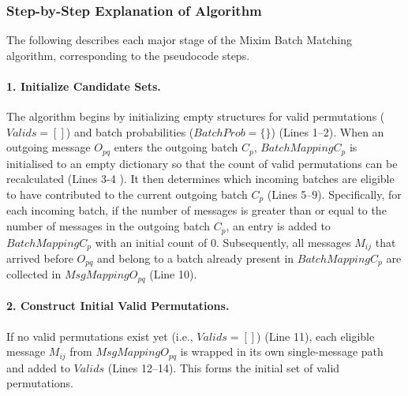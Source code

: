 \documentclass{article}
\begin{document}
\subsubsection*{Step-by-Step Explanation of Algorithm}

The following describes each major stage of the Mixim Batch Matching algorithm, corresponding to the pseudocode steps.

\paragraph{1. Initialize Candidate Sets.}
The algorithm begins by initializing empty structures for valid permutations ($Valids = []$) and batch probabilities ($BatchProb = \{\}$) (Lines 1–2). When an outgoing message $O_{pq}$ enters the outgoing batch $C_p$, $BatchMappingC_p$ is initialised to an empty dictionary so that the count of valid permutations can be recalculated (Lines 3-4 ).
It then determines which incoming batches are eligible to have contributed to the current outgoing batch $C_p$ (Lines 5–9). Specifically, for each incoming batch, if the number of messages is greater than or equal to the number of messages in the outgoing batch $C
_p$, an entry is added to $BatchMappingC_p$ with an initial count of $0$.  
Subsequently, all messages $M_{ij}$ that arrived before $O_{pq}$ and belong to a batch already present in $BatchMappingC_p$ are collected in $MsgMappingO_{pq}$ (Line 10).

\paragraph{2. Construct Initial Valid Permutations.}
If no valid permutations exist yet (i.e., $Valids = []$) (Line 11), each eligible message $M_{ij}$ from $MsgMappingO_{pq}$ is wrapped in its own single-message path and added to $Valids$ (Lines 12–14). This forms the initial set of valid permutations.
\end{document}
